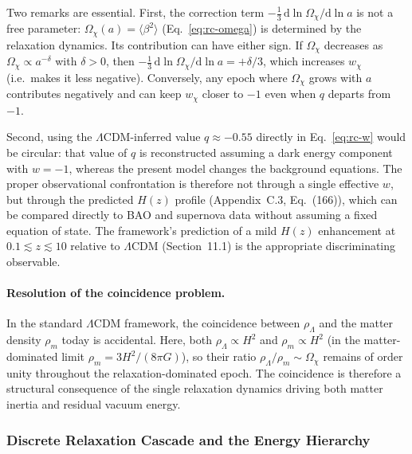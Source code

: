       Two remarks are essential.
      First, the correction term $-\tfrac{1}{3}\,\mathrm{d}\ln\Omega_\chi/\mathrm{d}\ln a$
      is not a free parameter: $\Omega_\chi(a) = \langle\beta^2\rangle$
      (Eq.~\eqref{eq:rc-omega}) is determined by the relaxation dynamics.
      Its contribution can have either sign.
      If $\Omega_\chi$ decreases as $\Omega_\chi \propto a^{-\delta}$ with
      $\delta > 0$, then
      $-\tfrac{1}{3}\,\mathrm{d}\ln\Omega_\chi/\mathrm{d}\ln a = +\delta/3$,
      which increases $w_\chi$ (i.e.\ makes it less negative).
      Conversely, any epoch where $\Omega_\chi$ grows with $a$ contributes
      negatively and can keep $w_\chi$ closer to $-1$ even when $q$ departs
      from $-1$.

      Second, using the $\Lambda$CDM-inferred value $q \approx -0.55$
      directly in Eq.~\eqref{eq:rc-w} would be circular: that value of $q$
      is reconstructed assuming a dark energy component with $w = -1$,
      whereas the present model changes the background equations.
      The proper observational confrontation is therefore not through a
      single effective $w$, but through the predicted $H(z)$ profile
      (Appendix~C.3, Eq.~(166)), which can be compared directly to
      BAO and supernova data without assuming a fixed equation of state.
      The framework's prediction of a mild $H(z)$ enhancement at
      $0.1 \lesssim z \lesssim 10$ relative to $\Lambda$CDM
      (Section~11.1) is the appropriate discriminating observable.

    \paragraph{Resolution of the coincidence problem.}
      In the standard $\Lambda$CDM framework, the coincidence between
      $\rho_\Lambda$ and the matter density $\rho_m$ today is accidental.
      Here, both $\rho_\Lambda \propto H^2$ and $\rho_m \propto H^2$ (in the
      matter-dominated limit $\rho_m = 3H^2/(8\pi G)$), so their ratio
      $\rho_\Lambda / \rho_m \sim \Omega_\chi$ remains of order unity
      throughout the relaxation-dominated epoch.
      The coincidence is therefore a structural consequence of the single
      relaxation dynamics driving both matter inertia and residual vacuum
      energy.

  \subsubsection*{Discrete Relaxation Cascade and the Energy Hierarchy}
    \label{sec:relax-cascade-hier}

